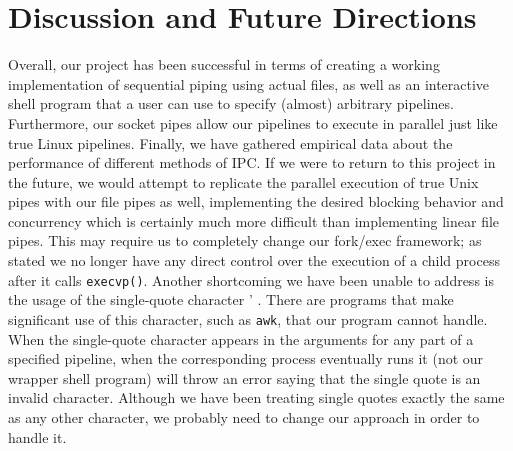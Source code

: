 \section{Discussion and Future Directions}

Overall, our project has been successful in terms of creating a working implementation of sequential piping using actual files, as well as an interactive shell program that a user can use to specify (almost) arbitrary pipelines. Furthermore, our socket pipes allow our pipelines to execute in parallel just like true Linux pipelines. Finally, we have gathered empirical data about the performance of different methods of IPC. If we were to return to this project in the future, we would attempt to replicate the parallel execution of true Unix pipes with our file pipes as well, implementing the desired blocking behavior and concurrency which is certainly much more difficult than implementing linear file pipes. This may require us to completely change our fork/exec framework; as stated we no longer have any direct control over the execution of a child process after it calls \texttt{execvp()}. Another shortcoming we have been unable to address is the usage of the single-quote character ' . There are programs that make significant use of this character, such as \texttt{awk}, that our program cannot handle. When the single-quote character appears in the arguments for any part of a specified pipeline, when the corresponding process eventually runs it (not our wrapper shell program) will throw an error saying that the single quote is an invalid character. Although we have been treating single quotes exactly the same as any other character, we probably need to change our approach in order to handle it.

